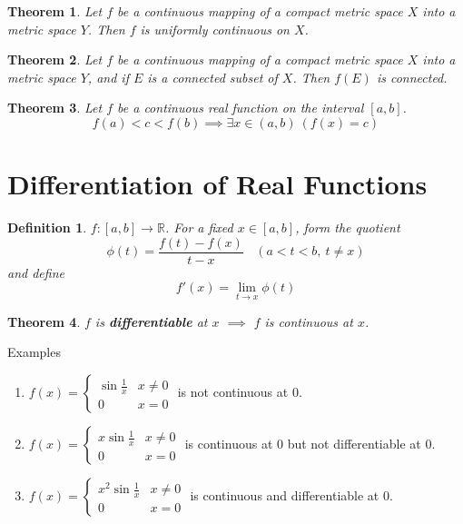 \documentclass[aps,pra,onecolumn,notitlepage,superscriptaddress]{revtex4-1}
\newcommand{\R}{\mathbb{R}}
\newtheorem{theo}{Theorem}
\newtheorem{defi}{Definition}
\begin{document}
    \begin{theo}
        Let $f$ be a continuous mapping of a compact metric space $X$ into a metric space $Y$. Then $f$ is uniformly continuous on $X$.
    \end{theo}

    \begin{theo}
        Let $f$ be a continuous mapping of a compact metric space $X$ into a metric space $Y$, and if $E$ is a connected subset of $X$. Then $f(E)$ is connected.
    \end{theo}

    \begin{theo}
        Let $f$ be a continuous real function on the interval $[a,b]$.
        \begin{equation}
            f(a) < c < f(b) \implies \exists x \in (a,b) \ \left( f(x)=c \right)
        \end{equation}
    \end{theo}

    \section{Differentiation of Real Functions}
    
    \begin{defi}
        $f: [a,b] \to \R$. For a fixed $x \in [a,b]$, form the quotient
        \begin{equation}
            \phi(t) = \frac{f(t)-f(x)}{t-x} \ \ \ \ (a<t<b, \ t \neq x)
        \end{equation}
        and define 
        \begin{equation}
            f'(x) = \lim_{t \to x} \phi(t)
        \end{equation}
    \end{defi}

    \begin{theo}
        $f$ is \textbf{differentiable} at $x$ $\implies$ $f$ is continuous at $x$.
    \end{theo}

    Examples
    \begin{enumerate}
        \item $f(x) = 
            \begin{cases}
                \sin \frac{1}{x} & x \neq 0 \\
                0 & x = 0
            \end{cases}
        $ is not continuous at $0$.
        \item $f(x) = 
            \begin{cases}
                x\sin \frac{1}{x} & x \neq 0 \\
                0 & x = 0
            \end{cases}
        $ is continuous at $0$ but not differentiable at $0$.
        \item $f(x) = 
            \begin{cases}
                x^2 \sin \frac{1}{x} & x \neq 0 \\
                0 & x = 0
            \end{cases}
        $ is continuous and differentiable at $0$.
    \end{enumerate}
    
\end{document}
